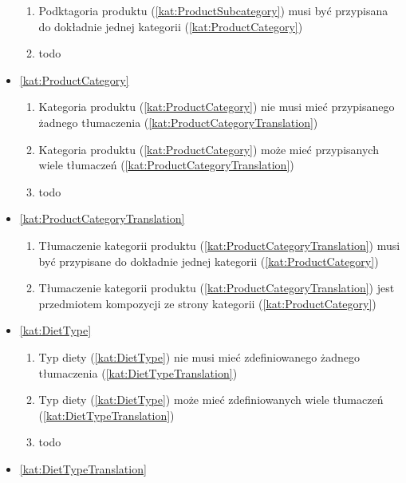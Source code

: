 \begin{itemize}[label={\textbf{Reguły dla}}, wide, labelwidth=!, labelindent=0pt]
\begin{enumerate}[label={\textbf{REG/\protect\threedigits{\arabic{enumi}}}}, wide, labelwidth=!, align=left, leftmargin=3cm, resume]
        \item Podktagoria produktu (\ref{kat:ProductSubcategory}) musi być przypisana do dokładnie jednej kategorii (\ref{kat:ProductCategory})
        \item todo
    \end{enumerate}
    \item\ref{kat:ProductCategory}
    \begin{enumerate}[label={\textbf{REG/\protect\threedigits{\arabic{enumi}}}}, wide, labelwidth=!, align=left, leftmargin=3cm, resume]
        \item Kategoria produktu (\ref{kat:ProductCategory}) nie musi mieć przypisanego żadnego tłumaczenia (\ref{kat:ProductCategoryTranslation})
        \item Kategoria produktu (\ref{kat:ProductCategory}) może mieć przypisanych wiele tłumaczeń (\ref{kat:ProductCategoryTranslation})
        \item todo
    \end{enumerate}
    \item\ref{kat:ProductCategoryTranslation}
    \begin{enumerate}[label={\textbf{REG/\protect\threedigits{\arabic{enumi}}}}, wide, labelwidth=!, align=left, leftmargin=3cm, resume]
        \item Tłumaczenie kategorii produktu (\ref{kat:ProductCategoryTranslation}) musi być przypisane do dokładnie jednej kategorii (\ref{kat:ProductCategory})
        \item Tłumaczenie kategorii produktu (\ref{kat:ProductCategoryTranslation}) jest przedmiotem kompozycji ze strony kategorii (\ref{kat:ProductCategory})
    \end{enumerate}
    \item\ref{kat:DietType}
    \begin{enumerate}[label={\textbf{REG/\protect\threedigits{\arabic{enumi}}}}, wide, labelwidth=!, align=left, leftmargin=3cm, resume]
        \item Typ diety (\ref{kat:DietType}) nie musi mieć zdefiniowanego żadnego tłumaczenia (\ref{kat:DietTypeTranslation})
        \item Typ diety (\ref{kat:DietType}) może mieć zdefiniowanych wiele tłumaczeń (\ref{kat:DietTypeTranslation})
        \item todo
    \end{enumerate}
    \item\ref{kat:DietTypeTranslation}

\end{itemize}
